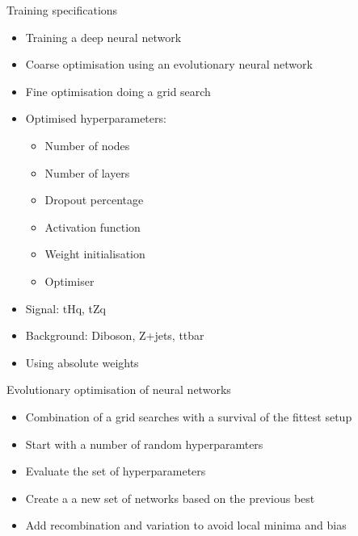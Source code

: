 \begin{frame}{Training specifications}
  \begin{itemize}
      \item Training a deep neural network
      \vspace{0.2cm}
      \item Coarse optimisation using an evolutionary neural network
      \vspace{0.2cm}
      \item Fine optimisation doing a grid search
      \vspace{0.2cm}
      \item Optimised hyperparameters:
          \begin{itemize}
              \item Number of nodes
              \item Number of layers
              \item Dropout percentage
              \item Activation function
              \item Weight initialisation
              \item Optimiser
          \end{itemize}
      \item Signal: tHq, tZq
      \item Background: Diboson, Z+jets, ttbar
      \item Using absolute weights
  \end{itemize}
\end{frame}

\begin{frame}{Evolutionary optimisation of neural networks}
    \begin{itemize}
        \item Combination of a grid searches with a survival of the fittest setup
        \vspace{0.2cm}
        \item Start with a number of random hyperparamters
        \vspace{0.2cm}
        \item Evaluate the set of hyperparameters
        \vspace{0.2cm}
        \item Create a a new set of networks based on the previous best
        \vspace{0.2cm}
        \item Add recombination and variation to avoid local minima and bias
    \end{itemize}
\end{frame}



